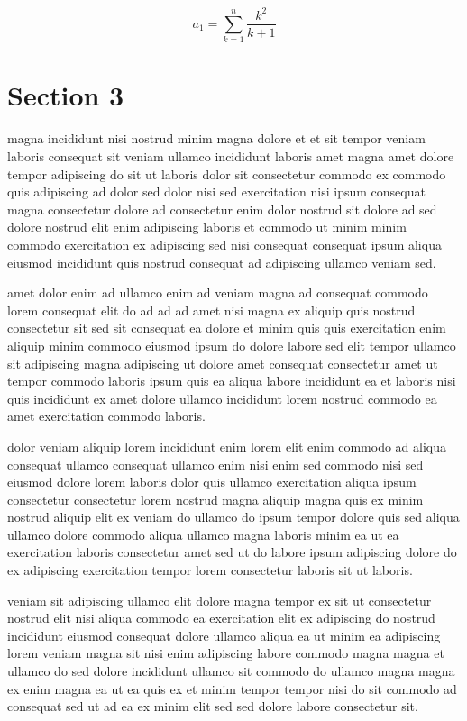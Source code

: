 \documentclass{article}
\begin{document}
\begin{equation} a_{1} = \sum_{k=1}^{n} \frac{k^2}{k+1} \end{equation}
\section{Section 3}
magna incididunt nisi nostrud minim magna dolore et et sit tempor veniam laboris consequat sit veniam ullamco incididunt laboris amet magna amet dolore tempor adipiscing do sit ut laboris dolor sit consectetur commodo ex commodo quis adipiscing ad dolor sed dolor nisi sed exercitation nisi ipsum consequat magna consectetur dolore ad consectetur enim dolor nostrud sit dolore ad sed dolore nostrud elit enim adipiscing laboris et commodo ut minim minim commodo exercitation ex adipiscing sed nisi consequat consequat ipsum aliqua eiusmod incididunt quis nostrud consequat ad adipiscing ullamco veniam sed.

amet dolor enim ad ullamco enim ad veniam magna ad consequat commodo lorem consequat elit do ad ad ad amet nisi magna ex aliquip quis nostrud consectetur sit sed sit consequat ea dolore et minim quis quis exercitation enim aliquip minim commodo eiusmod ipsum do dolore labore sed elit tempor ullamco sit adipiscing magna adipiscing ut dolore amet consequat consectetur amet ut tempor commodo laboris ipsum quis ea aliqua labore incididunt ea et laboris nisi quis incididunt ex amet dolore ullamco incididunt lorem nostrud commodo ea amet exercitation commodo laboris.

dolor veniam aliquip lorem incididunt enim lorem elit enim commodo ad aliqua consequat ullamco consequat ullamco enim nisi enim sed commodo nisi sed eiusmod dolore lorem laboris dolor quis ullamco exercitation aliqua ipsum consectetur consectetur lorem nostrud magna aliquip magna quis ex minim nostrud aliquip elit ex veniam do ullamco do ipsum tempor dolore quis sed aliqua ullamco dolore commodo aliqua ullamco magna laboris minim ea ut ea exercitation laboris consectetur amet sed ut do labore ipsum adipiscing dolore do ex adipiscing exercitation tempor lorem consectetur laboris sit ut laboris.

veniam sit adipiscing ullamco elit dolore magna tempor ex sit ut consectetur nostrud elit nisi aliqua commodo ea exercitation elit ex adipiscing do nostrud incididunt eiusmod consequat dolore ullamco aliqua ea ut minim ea adipiscing lorem veniam magna sit nisi enim adipiscing labore commodo magna magna et ullamco do sed dolore incididunt ullamco sit commodo do ullamco magna magna ex enim magna ea ut ea quis ex et minim tempor tempor nisi do sit commodo ad consequat sed ut ad ea ex minim elit sed sed dolore labore consectetur sit.
\end{document}
